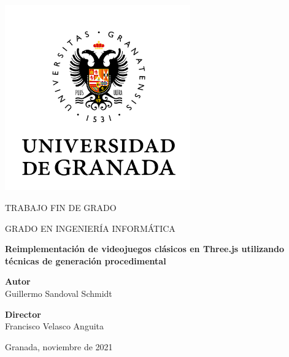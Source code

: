 \begin{titlepage}
    \centering
    
    \vspace*{-2cm}  
    \includegraphics[width=0.6\textwidth]{portada/logo.png}\par
    
    \vspace{0.5cm}
    \Large{TRABAJO FIN DE GRADO\par}\par
    
    \vspace{0.4cm}
    \large {GRADO EN INGENIERÍA INFORMÁTICA}\par
    
    \vspace{1.5cm}
    \huge{
        \bfseries{Reimplementación de videojuegos clásicos en Three.js utilizando técnicas de generación procedimental}
    }\par
    
    \vspace{1.5cm}
    \large{
        \textbf{Autor} \\ Guillermo Sandoval Schmidt\par
        \vspace{0.5cm}
        \textbf{Director} \\ Francisco Velasco Anguita\par
    }
    
    \vfill
    {\large Granada, noviembre de 2021 \par}
\end{titlepage}